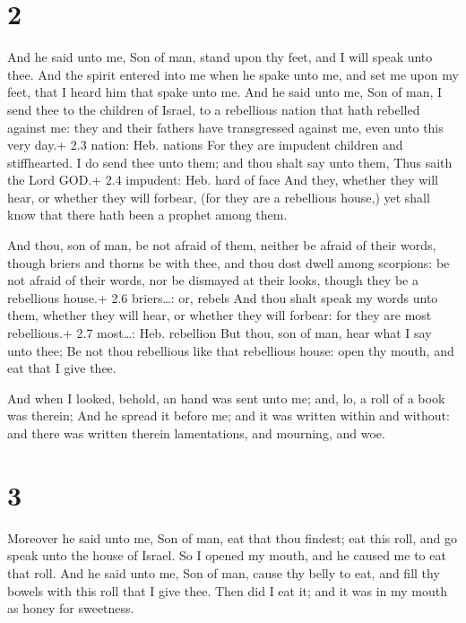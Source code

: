 \hypertarget{section-1}{%
\section{2}\label{section-1}}

 And he said unto me, Son of man, stand upon thy feet, and I
will speak unto thee.  And the spirit entered into me when
he spake unto me, and set me upon my feet, that I heard him that spake
unto me.  And he said unto me, Son of man, I send thee to
the children of Israel, to a rebellious nation that hath rebelled
against me: they and their fathers have transgressed against me, even
unto this very day.+ 2.3 nation: Heb. nations  For they are
impudent children and stiffhearted. I do send thee unto them; and thou
shalt say unto them, Thus saith the Lord GOD.+ 2.4 impudent: Heb. hard
of face  And they, whether they will hear, or whether they
will forbear, (for they are a rebellious house,) yet shall know that
there hath been a prophet among them.

 And thou, son of man, be not afraid of them, neither be
afraid of their words, though briers and thorns be with thee, and thou
dost dwell among scorpions: be not afraid of their words, nor be
dismayed at their looks, though they be a rebellious house.+ 2.6
briers\ldots: or, rebels  And thou shalt speak my words unto
them, whether they will hear, or whether they will forbear: for they are
most rebellious.+ 2.7 most\ldots: Heb. rebellion  But thou,
son of man, hear what I say unto thee; Be not thou rebellious like that
rebellious house: open thy mouth, and eat that I give thee.

 And when I looked, behold, an hand was sent unto me; and,
lo, a roll of a book was therein;  And he spread it before
me; and it was written within and without: and there was written therein
lamentations, and mourning, and woe.

\hypertarget{section-2}{%
\section{3}\label{section-2}}

 Moreover he said unto me, Son of man, eat that thou
findest; eat this roll, and go speak unto the house of Israel.
 So I opened my mouth, and he caused me to eat that roll.
 And he said unto me, Son of man, cause thy belly to eat,
and fill thy bowels with this roll that I give thee. Then did I eat it;
and it was in my mouth as honey for sweetness.

